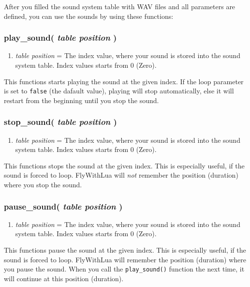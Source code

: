 \documentclass[11pt,parskip=half,a4paper]{scrartcl}
\begin{document}
After you filled the sound system table with WAV files and all parameters are defined, you can use the sounds by using these functions:

\subsubsection{ play\_sound( \emph{table position} )}

\begin{enumerate}
	\item \emph{table position} = The index value, where your sound is stored into the sound system table. Index values starts from 0 (Zero).
\end{enumerate}

This functions starts playing the sound at the given index. If the loop parameter is set to \verb|false| (the dafault value), playing will stop automatically, else it will restart from the beginning until you stop the sound.

\subsubsection{ stop\_sound( \emph{table position} )}

\begin{enumerate}
	\item \emph{table position} = The index value, where your sound is stored into the sound system table. Index values starts from 0 (Zero).
\end{enumerate}

This functions stops the sound at the given index. This is especially useful, if the sound is forced to loop. FlyWithLua will \emph{not} remember the position (duration) where you stop the sound.

\subsubsection{ pause\_sound( \emph{table position} )}

\begin{enumerate}
	\item \emph{table position} = The index value, where your sound is stored into the sound system table. Index values starts from 0 (Zero).
\end{enumerate}

This functions pause the sound at the given index. This is especially useful, if the sound is forced to loop. FlyWithLua will remember the position (duration) where you pause the sound. When you call the \verb|play_sound()| function the next time, it will continue at this position (duration).
\end{document}
